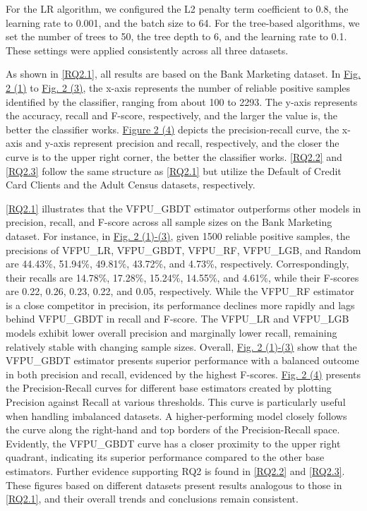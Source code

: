 \documentclass[10pt,journal,compsoc]{IEEEtran}
\begin{document}
For the LR algorithm, we configured the L2 penalty term coefficient to 0.8, the learning rate to 0.001, and the batch size to 64. For the tree-based algorithms, we set the number of trees to 50, the tree depth to 6, and the learning rate to 0.1. These settings were applied consistently across all three datasets.

As shown in \autoref{RQ2.1}, all results are based on the Bank Marketing dataset. In \hyperref[RQ2.1.sub1]{Fig. 2 (1)} to \hyperref[RQ2.1.sub3]{Fig. 2 (3)}, the x-axis represents the number of reliable positive samples identified by the classifier, ranging from about 100 to 2293. The y-axis represents the accuracy, recall and F-score, respectively, and the larger the value is, the better the classifier works. \hyperref[RQ2.1.sub4]{Figure 2 (4)} depicts the precision-recall curve, the x-axis and y-axis represent precision and recall, respectively, and the closer the curve is to the upper right corner, the better the classifier works. \autoref{RQ2.2} and \autoref{RQ2.3} follow the same structure as \autoref{RQ2.1} but utilize the Default of Credit Card Clients and the Adult Census datasets, respectively.

\autoref{RQ2.1} illustrates that the VFPU\_GBDT estimator outperforms other models in precision, recall, and F-score across all sample sizes on the Bank Marketing dataset. For instance, in \hyperref[RQ2.1.sub1]{Fig. 2 (1)-(3)}, given 1500 reliable positive samples, the precisions of VFPU\_LR, VFPU\_GBDT, VFPU\_RF, VFPU\_LGB, and Random are 44.43\%, 51.94\%, 49.81\%, 43.72\%, and 4.73\%, respectively. Correspondingly, their recalls are 14.78\%, 17.28\%, 15.24\%, 14.55\%, and 4.61\%, while their F-scores are 0.22, 0.26, 0.23, 0.22, and 0.05, respectively. While the VFPU\_RF estimator is a close competitor in precision, its performance declines more rapidly and lags behind VFPU\_GBDT in recall and F-score. The VFPU\_LR and VFPU\_LGB models exhibit lower overall precision and marginally lower recall, remaining relatively stable with changing sample sizes. Overall, \hyperref[RQ2.1.sub1]{Fig. 2 (1)-(3)} show that the VFPU\_GBDT estimator presents superior performance with a balanced outcome in both precision and recall, evidenced by the highest F-scores. \hyperref[RQ2.1.sub4]{Fig. 2 (4)} presents the Precision-Recall curves for different base estimators created by plotting Precision against Recall at various thresholds. This curve is particularly useful when handling imbalanced datasets. A higher-performing model closely follows the curve along the right-hand and top borders of the Precision-Recall space. Evidently, the VFPU\_GBDT curve has a closer proximity to the upper right quadrant, indicating its superior performance compared to the other base estimators.
Further evidence supporting RQ2 is found in \autoref{RQ2.2} and \autoref{RQ2.3}. These figures based on different datasets present results analogous to those in \autoref{RQ2.1}, and their overall trends and conclusions remain consistent. 
\end{document}

